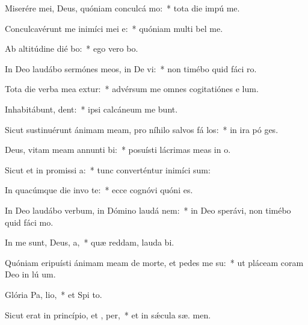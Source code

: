 \item Miserére mei, Deus, quóniam conculcá  mo:~* tota die impú  me.
\item Conculcavérunt me inimíci mei  e:~* quóniam multi bel  me.
\item Ab altitúdine dié bo:~* ego vero   bo.
\item In Deo laudábo sermónes meos, in De vi:~* non timébo quid fáci  ro.
\item Tota die verba mea extur:~* advérsum me omnes cogitatiónes e  lum.
\item Inhabitábunt,  dent:~* ipsi calcáneum me bunt.
\item Sicut sustinuérunt ánimam meam, pro níhilo salvos fá los:~* in ira pó ges.
\item Deus, vitam meam annunti bi:~* posuísti lácrimas meas in  o.
\item Sicut et in promissi a:~* tunc converténtur inimíci  sum:
\item In quacúmque die invo te:~* ecce cognóvi quóni   es.
\item In Deo laudábo verbum, in Dómino laudá nem:~* in Deo sperávi, non timébo quid fáci  mo.
\item In me sunt, Deus,  a,~* quæ reddam, lauda bi.
\item Quóniam eripuísti ánimam meam de morte, et pedes me  su:~* ut pláceam coram Deo in lú um.
\item Glória Pa,  lio,~* et Spi to.
\item Sicut erat in princípio, et ,  per,~* et in sǽcula sæ. men.
